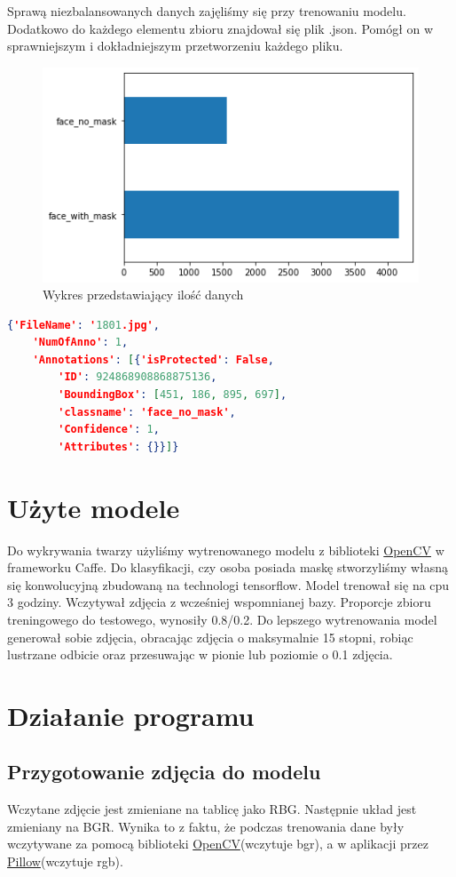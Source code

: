 \documentclass[12pt]{article}
\begin{document}
	Sprawą niezbalansowanych danych zajęliśmy się przy trenowaniu modelu.
	Dodatkowo do każdego elementu zbioru znajdował się plik .json. Pomógł on w sprawniejszym i dokładniejszym przetworzeniu każdego pliku.
	\begin{figure}[h]
		\centering
		\includegraphics[width=\textwidth]{dane.png}
		\caption{Wykres przedstawiający ilość danych}
		\label{fig:dane}
	\end{figure}
	\begin{lstlisting}[language=json,caption=Przykład pliku json, captionpos=b]
{'FileName': '1801.jpg',
	'NumOfAnno': 1,
	'Annotations': [{'isProtected': False,
		'ID': 924868908868875136,
		'BoundingBox': [451, 186, 895, 697],
		'classname': 'face_no_mask',
		'Confidence': 1,
		'Attributes': {}}]}
	\end{lstlisting}
	\section{Użyte modele}
	Do wykrywania twarzy użyliśmy wytrenowanego modelu z biblioteki \href{https://opencv.org/}{OpenCV} w frameworku Caffe\cite{jia_caffe_2014}. Do klasyfikacji, czy osoba posiada maskę stworzyliśmy własną się konwolucyjną zbudowaną na technologi tensorflow\cite{tensorflow2015-whitepaper}. Model trenował się na cpu 3 godziny. Wczytywał zdjęcia z wcześniej wspomnianej bazy. Proporcje zbioru treningowego do testowego, wynosiły 0.8/0.2. Do lepszego wytrenowania model generował sobie zdjęcia, obracając zdjęcia o maksymalnie 15 stopni, robiąc lustrzane odbicie oraz przesuwając w pionie lub poziomie o 0.1 zdjęcia.
	\section{Działanie programu}
		\subsection{Przygotowanie zdjęcia do modelu}
		Wczytane zdjęcie jest zmieniane na tablicę jako RBG. Następnie układ jest zmieniany na BGR. Wynika to z faktu, że podczas trenowania dane były wczytywane za pomocą biblioteki \href{https://opencv.org/}{OpenCV}(wczytuje bgr), a w aplikacji przez \href{https://pillow.readthedocs.io/en/stable/}{Pillow}(wczytuje rgb).
		
\end{document}
